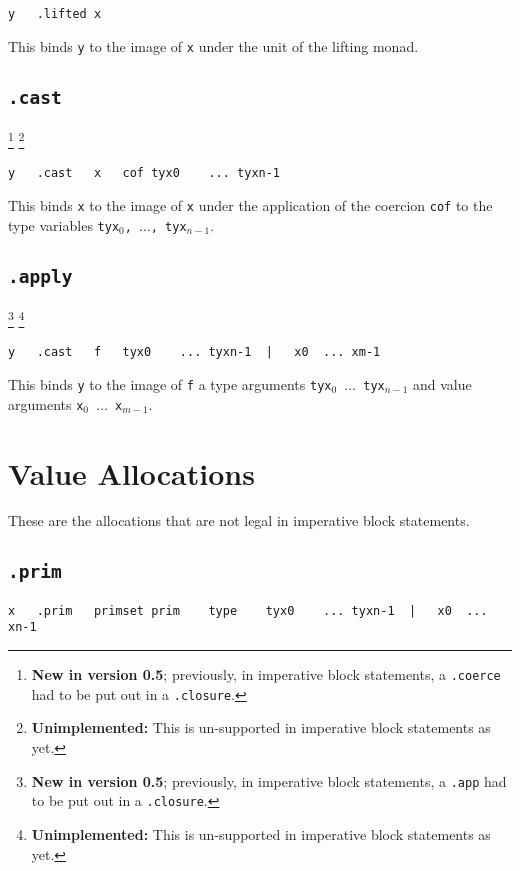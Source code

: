 \documentclass{report}
\newcommand\stringcode[1]{\texttt{#1}}
\newcommand\unimpl[1]{\footnote{\textbf{Unimplemented: }#1}}
\newcommand\new[2]{\footnote{\textbf{New in version #1}; previously, #2}}
\begin{document}
\begin{verbatim}
y	.lifted	x
\end{verbatim}

This binds \stringcode{y} to the image of \stringcode{x} under the unit of the lifting monad.

\subsection{\stringcode{.cast}}
\new{0.5}{in imperative block statements, a \stringcode{.coerce} had to be put out in a \stringcode{.closure}.}
\unimpl{This is un-supported in imperative block statements as yet.}

\begin{verbatim}
y	.cast	x	cof	tyx0	...	tyxn-1
\end{verbatim}

This binds \stringcode{x} to the image of \stringcode{x} under the application of the coercion \stringcode{cof} to the type variables \stringcode{tyx$_0$, $\ldots$, tyx$_{n-1}$}.

\subsection{\stringcode{.apply}}
\new{0.5}{in imperative block statements, a \stringcode{.app} had to be put out in a \stringcode{.closure}.}
\unimpl{This is un-supported in imperative block statements as yet.}

\begin{verbatim}
y	.cast	f	tyx0	...	tyxn-1	|	x0	...	xm-1
\end{verbatim}

This binds \stringcode{y} to the image of \stringcode{f} a type arguments \stringcode{tyx$_0$ $\ldots$ tyx$_{n-1}$} and value arguments \stringcode{x$_0$ $\ldots$ x$_{m-1}$}.

\section{Value Allocations}
\label{value_alloc}

These are the allocations that are not legal in imperative block statements.

\subsection{\stringcode{.prim}}

\begin{verbatim}
x	.prim	primset	prim	type	tyx0	...	tyxn-1	|	x0	...	xn-1
\end{verbatim}
\end{document}
